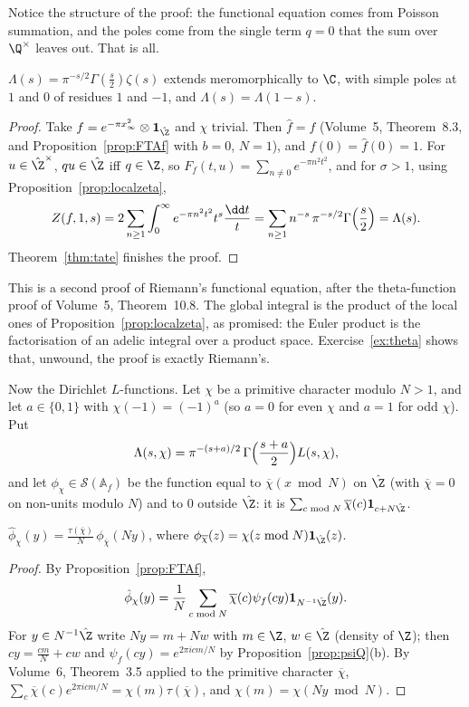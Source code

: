 Notice the structure of the proof: the functional equation comes from Poisson summation, and the poles come from the single term
$q=0$ that the sum over $\Q^\times$ leaves out. That is all.

\begin{corollary}[Riemann]\label{cor:riemannFE}
$\Lambda(s)=\pi^{-s/2}\Gamma(\frac s2)\zeta(s)$ extends meromorphically to $\C$, with simple poles at $1$ and $0$ of residues $1$ and $-1$, and
$\Lambda(s)=\Lambda(1-s)$.
\end{corollary}
\begin{proof}
Take $f=e^{-\pi x_\infty^2}\otimes\mathbf 1_{\hat{\Z}}$ and $\chi$ trivial. Then $\hat f=f$ (Volume~5, Theorem~8.3, and Proposition~\ref{prop:FTAf}
with $b=0$, $N=1$), and $f(0)=\hat f(0)=1$. For $u\in\hat{\Z}^\times$, $qu\in\hat{\Z}$ iff $q\in\Z$, so $F_f(t,u)=\sum_{n\ne0}e^{-\pi n^2t^2}$, and for
$\sigma>1$, using Proposition~\ref{prop:localzeta},
\[
Z(f,1,s)=2\sum_{n\ge1}\int_0^\infty e^{-\pi n^2t^2}t^s\frac{\dd t}t=\sum_{n\ge1}n^{-s}\,\pi^{-s/2}\Gamma\Bigl(\frac s2\Bigr)=\Lambda(s).
\]
Theorem~\ref{thm:tate} finishes the proof.
\end{proof}

This is a second proof of Riemann's functional equation, after the theta-function proof of Volume~5, Theorem~10.8.
The global integral is the product of the local ones of Proposition~\ref{prop:localzeta}, as promised: the Euler product is the factorisation
of an adelic integral over a product space. Exercise~\ref{ex:theta} shows that, unwound, the proof is exactly Riemann's.

Now the Dirichlet $L$-functions. Let $\chi$ be a primitive character modulo $N>1$, and let $a\in\{0,1\}$ with $\chi(-1)=(-1)^a$ (so $a=0$ for even
$\chi$ and $a=1$ for odd $\chi$). Put
\[
\Lambda(s,\chi)=\pi^{-(s+a)/2}\,\Gamma\Bigl(\frac{s+a}2\Bigr)L(s,\chi),
\]
and let $\phi_\chi\in\mathcal S(\mathbb{A}_f)$ be the function equal to $\overline\chi(x\bmod N)$ on $\hat{\Z}$ (with $\overline\chi=0$ on non-units modulo $N$) and to
$0$ outside $\hat{\Z}$: it is $\sum_{c\bmod N}\overline\chi(c)\mathbf 1_{c+N\hat{\Z}}$.

\begin{lemma}\label{lem:phichi}
$\hat{\phi}_\chi(y)=\frac{\tau(\overline\chi)}N\,\phi_{\overline\chi}(Ny)$, where $\phi_{\overline\chi}(z)=\chi(z\bmod N)\mathbf 1_{\hat{\Z}}(z)$.
\end{lemma}
\begin{proof}
By Proposition~\ref{prop:FTAf},
\[
\hat{\phi}_\chi(y)=\frac1N\sum_{c\bmod N}\overline\chi(c)\psi_f(cy)\mathbf 1_{N^{-1}\hat{\Z}}(y).
\]
For $y\in N^{-1}\hat{\Z}$ write $Ny=m+Nw$ with
$m\in\Z$, $w\in\hat{\Z}$ (density of $\Z$); then $cy=\frac{cm}N+cw$ and $\psi_f(cy)=e^{2\pi icm/N}$ by Proposition~\ref{prop:psiQ}(b). By Volume~6,
Theorem~3.5 applied to the primitive character $\overline\chi$, $\sum_c\overline\chi(c)e^{2\pi icm/N}=\chi(m)\tau(\overline\chi)$, and $\chi(m)=\chi(Ny\bmod N)$.
\end{proof}

